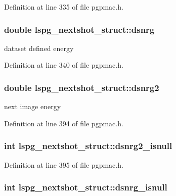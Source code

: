 Definition at line 335 of file pgpmac.\-h.

\hypertarget{structlspg__nextshot__struct_a371e574055fec7660b8f2e637eaf9f25}{
\subsubsection[{dsnrg}]{\setlength{\rightskip}{0pt plus 5cm}double lspg\-\_\-nextshot\-\_\-struct\-::dsnrg}}\label{structlspg__nextshot__struct_a371e574055fec7660b8f2e637eaf9f25}


dataset defined energy 



Definition at line 340 of file pgpmac.\-h.

\hypertarget{structlspg__nextshot__struct_ae461439c2af31255227765c0fb61850f}{
\subsubsection[{dsnrg2}]{\setlength{\rightskip}{0pt plus 5cm}double lspg\-\_\-nextshot\-\_\-struct\-::dsnrg2}}\label{structlspg__nextshot__struct_ae461439c2af31255227765c0fb61850f}


next image energy 



Definition at line 394 of file pgpmac.\-h.

\hypertarget{structlspg__nextshot__struct_aee9f8196dd9bcea832a60f2f0ea3a999}{
\subsubsection[{dsnrg2\-\_\-isnull}]{\setlength{\rightskip}{0pt plus 5cm}int lspg\-\_\-nextshot\-\_\-struct\-::dsnrg2\-\_\-isnull}}\label{structlspg__nextshot__struct_aee9f8196dd9bcea832a60f2f0ea3a999}


Definition at line 395 of file pgpmac.\-h.

\hypertarget{structlspg__nextshot__struct_ad14d8bb50290ec12e58f4aaec5cc5aab}{
\subsubsection[{dsnrg\-\_\-isnull}]{\setlength{\rightskip}{0pt plus 5cm}int lspg\-\_\-nextshot\-\_\-struct\-::dsnrg\-\_\-isnull}}\label{structlspg__nextshot__struct_ad14d8bb50290ec12e58f4aaec5cc5aab}


